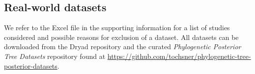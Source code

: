 \documentclass[10pt,letterpaper]{article}
\begin{document}
\subsection*{Real-world datasets}

We refer to the Excel file in the supporting information for a list of studies considered and possible reasons for exclusion of a dataset. All datasets can be downloaded from the Dryad repository \cite{dryad} and the curated \emph{Phylogenetic Posterior Tree Datasets} repository \cite{tree_dataset} found at \url{https://github.com/tochsner/phylogenetic-tree-posterior-datasets}.

\nolinenumbers


\end{document}
